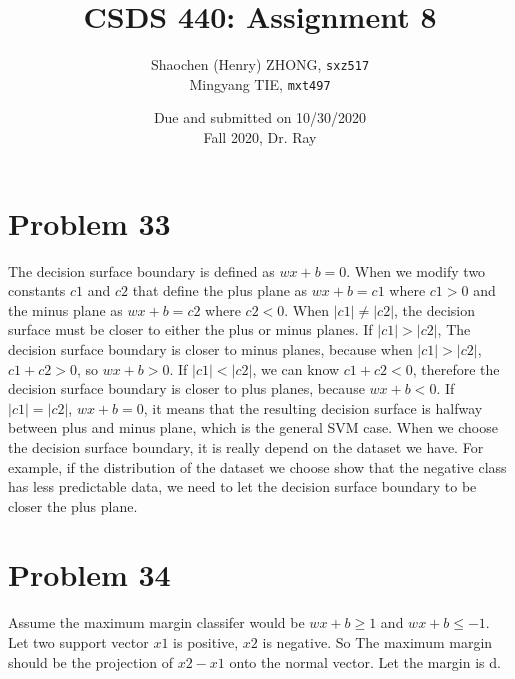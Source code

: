 \documentclass[12pt]{article}
\newcommand{\ilcode}{\texttt}
\begin{document}
\title{\textbf{CSDS 440: Assignment 8}}

\author{Shaochen (Henry) ZHONG, \ilcode{sxz517} \\ Mingyang TIE, \ilcode{mxt497}}
\date{Due and submitted on 10/30/2020 \\ Fall 2020, Dr. Ray}
\maketitle


\section{Problem 33}

The decision surface boundary is defined as $wx + b = 0$. When we modify two constants $c1$ and $c2$ that define the plus plane as $wx + b = c1$ where $c1 > 0$ and the minus plane as $wx + b = c2$ where $c2 < 0$. When $|c1| \neq |c2|$, the	decision surface must be closer to either the plus or minus planes. If $|c1| > |c2|$, The decision surface boundary is closer to minus planes, because when $|c1| > |c2|$, $c1 + c2 > 0$, so $wx + b > 0$. If $|c1| < |c2|$, we can know $c1 + c2 < 0$, therefore the decision surface boundary is closer to plus planes, because $wx + b < 0$. If $|c1| = |c2|$, $wx + b = 0$, it means that the resulting decision surface is halfway between plus and minus plane, which is the general SVM case. \newline
When we choose the decision surface boundary, it is really depend on the dataset we have.  For example, if the distribution of the dataset we choose show that the negative class has less predictable data, we need to let the decision surface boundary to be closer the plus plane.


\section{Problem 34}
Assume the maximum margin classifer would be $wx + b \geq 1$ and $wx + b \leq -1$. Let two support vector $x1$ is positive, $x2$ is negative. So The maximum margin should be the projection of $x2 - x1$ onto the normal vector. Let the margin is d.
\end{document}
